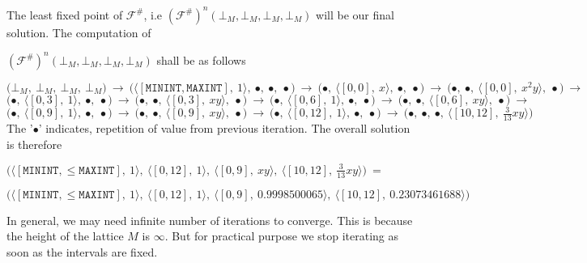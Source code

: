 \documentclass[final,3p, review, times]{util/elsarticle}
\begin{document}
The least fixed point of $\mathcal{F^\#}$, i.e $(\mathcal{F^\#})^n(\bot_M, \bot_M, \bot_M, \bot_M)$ will be our final solution. The computation of

\noindent$(\mathcal{F^\#})^n(\bot_M, \bot_M, \bot_M, \bot_M)$ shall be as follows

\noindent
$
\bigg(\bot_M,\ \bot_M,\ \bot_M,\ \bot_M\bigg)\ \to\ 
\bigg(\big\langle[\mathtt{MININT},\mathtt{MAXINT}],\ 1\big\rangle,\ \bullet,\ \bullet,\ \bullet\bigg)\ \to\ 
\bigg(\bullet,\ \big\langle[0,0],\ x\big\rangle,\ \bullet,\ \bullet\bigg)\ \to\ 
\bigg(\bullet,\ \bullet,\ \big\langle[0,0],\ x^2y\big\rangle,\ \bullet\bigg)\ \to
$\\
$
\bigg(\bullet,\ \big\langle[0,3],\ 1\big\rangle,\ \bullet,\ \bullet\bigg)\ \to\ 
\bigg(\bullet,\ \bullet,\ \big\langle[0,3],\ xy\big\rangle,\ \bullet\bigg)\ \to\ 
\bigg(\bullet,\ \big\langle[0,6],\ 1\big\rangle,\ \bullet,\ \bullet\bigg)\ \to\ 
\bigg(\bullet,\ \bullet,\ \big\langle[0,6],\ xy\big\rangle,\ \bullet\bigg)\ \to
$\\
$
\bigg(\bullet,\ \big\langle[0,9],\ 1\big\rangle,\ \bullet,\ \bullet\bigg)\ \to\ \bigg(\bullet,\ \bullet,\ \big\langle[0,9],\ xy\big\rangle,\ \bullet\bigg)\ \to\ \bigg(\bullet,\ \big\langle[0,12],\ 1\big\rangle,\ \bullet,\ \bullet\bigg)\ \to\ \bigg(\bullet,\ \bullet,\ \bullet,\ \big\langle[10,12],\ \frac{3}{13}xy\big\rangle\bigg)
$\\

The '$\bullet$' indicates, repetition of value from previous iteration. The overall solution is therefore

\noindent$\bigg(\Big\langle[\mathtt{MININT},\leq\mathtt{MAXINT}],\ 1\Big\rangle,\ \Big\langle[0,12],\ 1\Big\rangle,\ \Big\langle[0,9],\ xy\Big\rangle,\ \Big\langle[10,12],\ \frac{3}{13}xy\Big\rangle\bigg)\ =$

\noindent$\bigg(\Big\langle[\mathtt{MININT},\leq\mathtt{MAXINT}],\ 1\Big\rangle,\ \Big\langle[0,12],\ 1\Big\rangle,\ \Big\langle[0,9],\ 0.9998500065\Big\rangle,\ \Big\langle[10,12],\ 0.23073461688\Big\rangle\bigg)$

In general, we may need infinite number of iterations to converge. This is because the height of the lattice $M$ is $\infty$. But for practical purpose we stop iterating as soon as the intervals are fixed.
 









\end{document}
